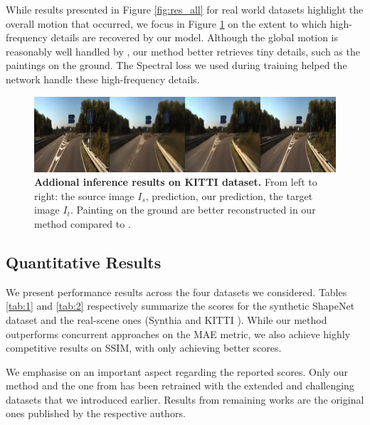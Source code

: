 While results presented in Figure \ref{fig:res_all} for real world datasets highlight the overall motion that occurred, we focus in Figure \ref{fig:res_all2} on the extent to which high-frequency details are recovered by our model. Although the global motion is reasonably well handled by \citep{kim2020novel}, our method better retrieves tiny details, such as the paintings on the ground. The Spectral loss we used during training helped the network handle these high-frequency details. 

\begin{figure}[h!]
    \begin{center}
    \includegraphics[width=\textwidth]{images/epipolarnvs/rebbutal_KITTI_3.jpg}
    \end{center}
     \caption{\textbf{Addional inference results on KITTI dataset.} From left to right: the source image  $I_s$, \citep{kim2020novel} prediction, our prediction, the target image $I_t$. Painting on the ground are better reconstructed in our method compared to \citep{kim2020novel}.}
     \label{fig:res_all2}
\end{figure}

  
\subsection{Quantitative Results}

We present performance results across the four datasets we considered. Tables \ref{tab:1} and \ref{tab:2} respectively summarize the scores for the synthetic ShapeNet \citep{chang2015shapenet} dataset and the real-scene ones (Synthia \citep{ros2016synthia} and KITTI \citep{geiger2012we}). While our method outperforms concurrent approaches on the \ac{MAE} metric, we also achieve highly competitive results on SSIM, with only \citep{sun2018multiview} achieving better scores. \newline

We emphasise on an important aspect regarding the reported scores. Only our method and the one from \citep{kim2020novel} has been retrained with the extended and challenging datasets that we introduced earlier. Results from remaining works \citep{tatarchenko2015single,zhou2016view,park2017transformation,sun2018multiview,} are the original ones published by the respective authors. 

